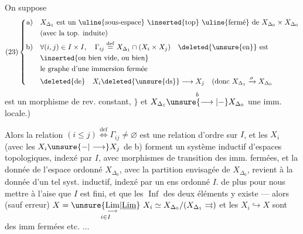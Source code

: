 On suppose
\[
(23)\left\{\begin{aligned}
\text{a)}\quad &X_{\Delta_1}\text{ est un \uline{sous-espace} \inserted{top} \uline{fermé} de }X_{\Delta_0}\times X_{\Delta_0}\\
&\text{(avec la top. induite)}\\
\text{b)}\quad &\forall(i,j)\in I\times I,\quad\Gamma_{ij}\overset{\mathrm{def}}{=}X_{\Delta_1}\cap(X_i\times X_j)\quad\text{\deleted{\unsure{en}} est}\\
&\text{\inserted{ou bien vide, ou bien}}\\
&\text{le graphe d'une immersion fermée}\\
&\deleted{\text{de}}\quad X_i\deleted{\text{\unsure{ds}}}\longrightarrow X_j
\quad\text{(donc }X_{\Delta_1}\xrightarrow{\sigma}X_{\Delta_0}
\end{aligned}\right.
\]
est un morphisme de rev.  constant, $\}$
 et
$X_{\Delta_1}\overset{b}{\unsure{\longrightarrow|-}}X_{\Delta_0}$ une imm. locale.)

Alors la relation $(i\leq j)\overset{\mathrm{def}}{\Longleftrightarrow}\Gamma_{ij}\ne\varnothing$ est une
relation d'ordre sur $I$,  et les $X_i$
(avec les $X_i\unsure{-|\longrightarrow}X_j$ de b) forment un
système inductif d'espaces topologiques,
indexé par $I$, avec morphismes de
transition des imm. fermées, et
la donnée de l'espace  ordonné $X_{\Delta_0}$,
 avec la partition envisagée de $X_{\Delta_0}$,
revient à la donnée d'un tel syst.
inductif, indexé par un ens ordonné $I$.
 de plus pour nous mettre
à l'aise que $I$ est fini, et que les
$\operatorname{Inf}$ des deux éléments y existe --- alors
(sauf erreur) $X=\underset{i\in I}{\unsure{\underset{\longrightarrow}{\mathrm{Lim}}|\underline{\mathrm{Lim}}}}\ X_i\simeq
X_{\Delta_0}/(X_{\Delta_1}\rightrightarrows)$
et les $X_i\hookrightarrow X$ sont des imm fermées
etc. ...
